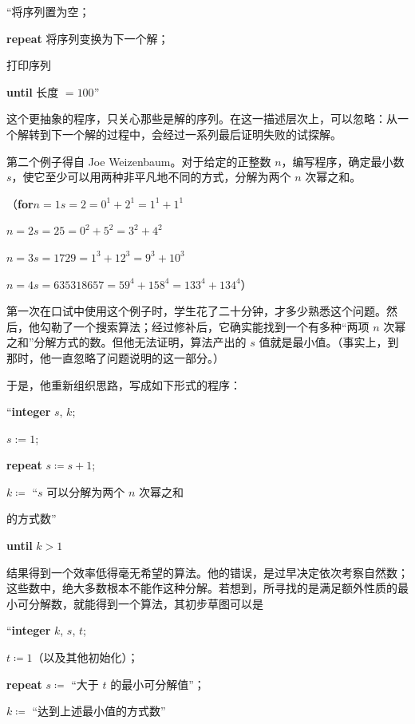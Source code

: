 \quad \hspace{-.4em}``将序列置为空；

\quad \textbf{repeat} 将序列变换为下一个解；

\quad \quad 打印序列

\quad \textbf{until} 长度 $= 100$''

这个更抽象的程序，只关心那些是解的序列。在这一描述层次上，可以忽略：从一个解转到下一个解的过程中，会经过一系列最后证明失败的试探解。

第二个例子得自 Joe Weizenbaum。对于给定的正整数 $n$，编写程序，确定最小数 $s$，使它至少可以用两种非平凡地不同的方式，分解为两个 $n$ 次幂之和。

\noindent
（\textbf{for}\tabto{2em}$n = 1$\tabto{6em}$s = 2 = 0^1 + 2^1 = 1^1 + 1^1$

\tabto{2em}$n = 2$\tabto{6em}$s = 25 = 0^2 + 5^2 = 3^2 + 4^2$

\tabto{2em}$n=3$\tabto{6em}$s=1729=1^3 +12^3 =9^3 +10^3$

\tabto{2em}$n = 4$\tabto{6em}$s = 635318657 = 59^4 + 158^4 = 133^4 + 134^4$）

第一次在口试中使用这个例子时，学生花了二十分钟，才多少熟悉这个问题。然后，他勾勒了一个搜索算法；经过修补后，它确实能找到一个有多种“两项 $n$ 次幂之和”分解方式的数。但他无法证明，算法产出的 $s$ 值就是最小值。（事实上，到那时，他一直忽略了问题说明的这一部分。）

于是，他重新组织思路，写成如下形式的程序：

\quad \hspace{-.4em}``\textbf{integer} $s$, $k$;

\quad $s:= 1$;

\quad \textbf{repeat} $s\coloneq s + 1$;

\quad \quad $k\coloneq$ “$s$ 可以分解为两个 $n$ 次幂之和

\quad \quad\quad 的方式数”

\quad \textbf{until} $k > 1$

\noindent
结果得到一个效率低得毫无希望的算法。他的错误，是过早决定依次考察自然数；这些数中，绝大多数根本不能作这种分解。若想到，所寻找的是满足额外性质的最小可分解数，就能得到一个算法，其初步草图可以是

\quad \hspace{-.4em}``\textbf{integer} $k$, $s$, $t$;

\quad $t \coloneq 1$（以及其他初始化）；

\quad \textbf{repeat} $s \coloneq$ “大于 $t$ 的最小可分解值”；

\quad \quad $k \coloneq$ “达到上述最小值的方式数”

